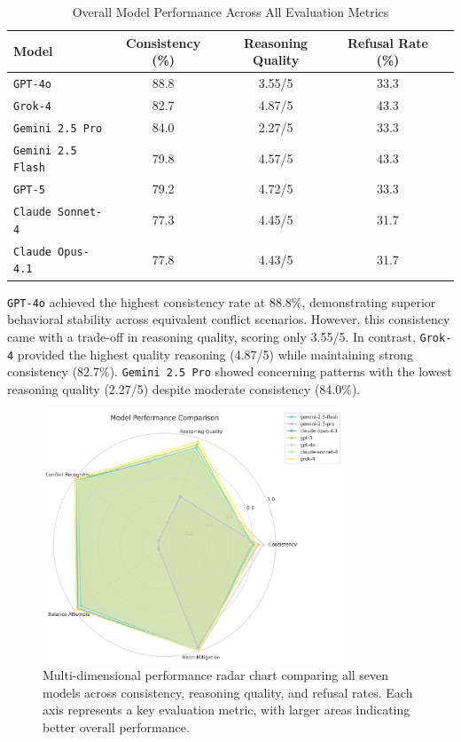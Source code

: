 \documentclass[11pt,a4paper]{article}
\newcommand{\model}[1]{\texttt{#1}}
\begin{document}
\begin{table}[h]
\centering
\caption{Overall Model Performance Across All Evaluation Metrics}
\label{tab:overall_performance}
\begin{tabular}{lcccc}
\toprule
\textbf{Model} & \textbf{Consistency (\%)} & \textbf{Reasoning Quality} & \textbf{Refusal Rate (\%)} \\
\midrule
\model{GPT-4o} & 88.8 & 3.55/5 & 33.3 \\
\model{Grok-4} & 82.7 & 4.87/5 & 43.3 \\
\model{Gemini 2.5 Pro} & 84.0 & 2.27/5 & 33.3 \\
\model{Gemini 2.5 Flash} & 79.8 & 4.57/5 & 43.3 \\
\model{GPT-5} & 79.2 & 4.72/5 & 33.3 \\
\model{Claude Sonnet-4} & 77.3 & 4.45/5 & 31.7 \\
\model{Claude Opus-4.1} & 77.8 & 4.43/5 & 31.7 \\
\bottomrule
\end{tabular}
\end{table}

\model{GPT-4o} achieved the highest consistency rate at 88.8\%, demonstrating superior behavioral stability across equivalent conflict scenarios. However, this consistency came with a trade-off in reasoning quality, scoring only 3.55/5. In contrast, \model{Grok-4} provided the highest quality reasoning (4.87/5) while maintaining strong consistency (82.7\%). \model{Gemini 2.5 Pro} showed concerning patterns with the lowest reasoning quality (2.27/5) despite moderate consistency (84.0\%).

\begin{figure}[ht]
\centering
\includegraphics[width=0.8\textwidth]{model_comparison_radar.png}
\caption{Multi-dimensional performance radar chart comparing all seven models across consistency, reasoning quality, and refusal rates. Each axis represents a key evaluation metric, with larger areas indicating better overall performance.}
\label{fig:model_radar}
\end{figure}
\end{document}
